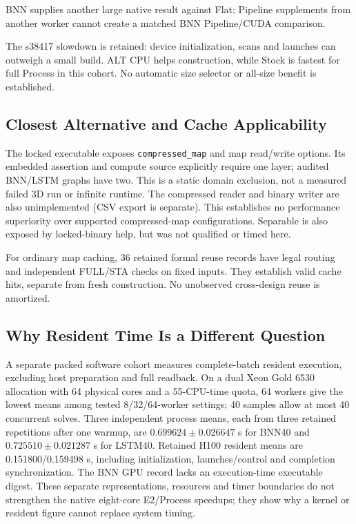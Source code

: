 BNN supplies another large native result against Flat; Pipeline supplements from another worker cannot create a matched BNN Pipeline/CUDA comparison.

The s38417 slowdown is retained: device initialization, scans and launches can outweigh a small build. ALT CPU helps construction, while Stock is fastest for full Process in this cohort. No automatic size selector or all-size benefit is established.

\subsection{Closest Alternative and Cache Applicability}\label{sec:applicability}
The locked executable exposes \texttt{compressed\_map} and map read/write options. Its embedded assertion and compute source explicitly require one layer; audited BNN/LSTM graphs have two. This is a static domain exclusion, not a measured failed 3D run or infinite runtime. The compressed reader and binary writer are also unimplemented (CSV export is separate). This establishes no performance superiority over supported compressed-map configurations. Separable is also exposed by locked-binary help, but was not qualified or timed here.

For ordinary map caching, 36 retained formal reuse records have legal routing and independent FULL/STA checks on fixed inputs. They establish valid cache hits, separate from fresh construction. No unobserved cross-design reuse is amortized.

\subsection{Why Resident Time Is a Different Question}
A separate packed software cohort measures complete-batch resident execution, excluding host preparation and full readback. On a dual Xeon Gold 6530 allocation with 64 physical cores and a 55-CPU-time quota, 64 workers give the lowest means among tested 8/32/64-worker settings; 40 samples allow at most 40 concurrent solves. Three independent process means, each from three retained repetitions after one warmup, are $0.699624\pm0.026647$ s for BNN40 and $0.725510\pm0.021287$ s for LSTM40. Retained H100 resident means are 0.151800/0.159498 s, including initialization, launches/control and completion synchronization. The BNN GPU record lacks an execution-time executable digest. These separate representations, resources and timer boundaries do not strengthen the native eight-core E2/Process speedups; they show why a kernel or resident figure cannot replace system timing.
